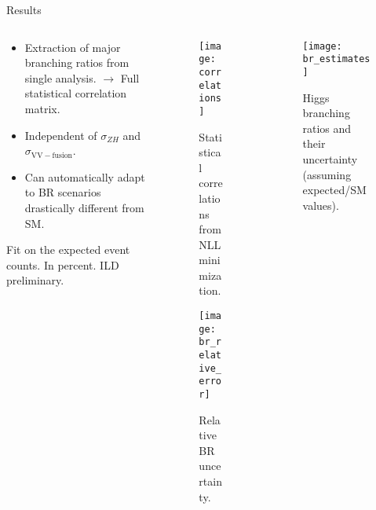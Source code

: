 \begin{block}{Results}
\begin{columns}
\begin{column}{.33\textwidth}

    \begin{itemize}
        \item Extraction of major branching ratios from single analysis.
            $\rightarrow$ Full statistical correlation matrix.
        \item Independent of $\sigma_{ZH}$ and $\sigma_{\mathrm{VV-fusion}}$.
        \item Can automatically adapt to BR scenarios
            drastically different from SM.
    \end{itemize}
    \vspace{\baselineskip}
    \begin{table}
        \caption{Fit on the
            expected event counts. In percent. ILD preliminary.}\label{tab:brs}
    \end{table}
\end{column}
\begin{column}{.33\textwidth}
    \begin{figure}
        \centering\texttt{[image: correlations]}
        \caption{Statistical correlations from NLL minimization.}
        \label{fig:correlations}
    \end{figure}
    \begin{figure}
        \centering\texttt{[image: br\_relative\_error]}
        \caption{Relative BR uncertainty.}
    \end{figure}
\end{column}
\begin{column}{.33\textwidth}
    \begin{figure}
        \centering\texttt{[image: br\_estimates]}
        \caption{
            Higgs branching ratios and their uncertainty
            (assuming expected/SM values).
        }
    \end{figure}
\end{column}
\end{columns}
\end{block}
